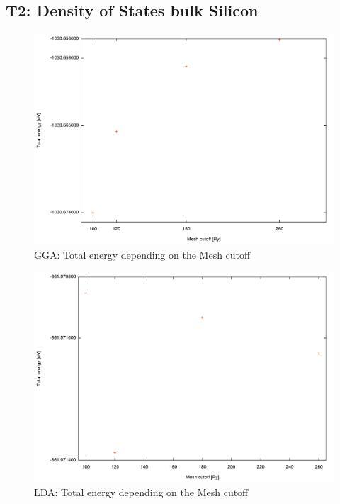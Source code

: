 \documentclass[12pt,a4paper]{scrartcl}
\begin{document}
\subsection{T2: Density of States bulk Silicon}
\begin{figure}[H]
\begin{center}
\includegraphics[width=12.0cm]{GGA_mesh.pdf}
\end{center}
\caption{GGA: Total energy depending on the Mesh cutoff}
\end{figure}
\begin{figure}[H]
\begin{center}
\includegraphics[width=12.0cm]{LDA_mesh.pdf}
\end{center}
\caption{LDA: Total energy depending on the Mesh cutoff}
\end{figure}
\end{document}
